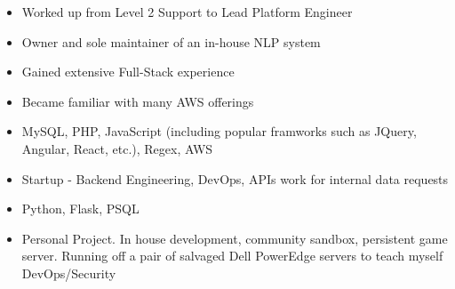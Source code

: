 \documentclass[10pt,a4paper]{altacv}
\begin{document}
\divider

\begin{itemize}
\item Worked up from Level 2 Support to Lead Platform Engineer
\item Owner and sole maintainer of an in-house NLP system
\item Gained extensive Full-Stack experience
\item Became familiar with many AWS offerings
\item MySQL, PHP, JavaScript (including popular framworks such as JQuery, Angular, React, etc.), Regex, AWS

\end{itemize}

\divider

\begin{itemize}
\item Startup - Backend Engineering, DevOps, APIs work for internal data requests
\item Python, Flask, PSQL
\end{itemize}

\divider




\begin{itemize}
\item Personal Project. In house development, community sandbox, persistent game server.
         Running off a pair of salvaged Dell PowerEdge servers to teach myself DevOps/Security
\end{itemize}

\medskip


\end{document}
